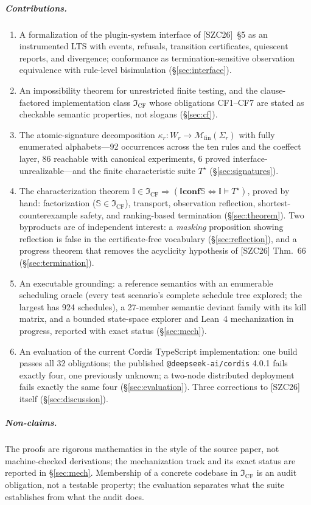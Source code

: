 \documentclass[sigplan,screen,review,nonacm]{acmart}
\newcommand{\Spec}{\ensuremath{\mathbb S}}
\newcommand{\Impl}{\ensuremath{\mathbb I}}
\newcommand{\conf}{\mathrel{\mathbf{conf}}}
\newcommand{\CF}{\ensuremath{\mathfrak I_{\mathrm{CF}}}}
\newcommand{\Tstar}{\ensuremath{T^{\star}}}
\newcommand{\occ}[1]{\ensuremath{\Sigma_{#1}}}
\newcommand{\kap}[1]{\ensuremath{\kappa_{#1}}}
\newcommand{\Mfin}{\ensuremath{\mathcal M_{\mathrm{fin}}}}
\newcommand{\SZC}{[SZC26]}
\begin{document}
\subparagraph{Contributions.}
\begin{enumerate}
\item A formalization of the plugin-system interface of \SZC{}~\S5 as an
  instrumented LTS with events, refusals, transition certificates, quiescent
  reports, and divergence; conformance as termination-sensitive observation
  equivalence with rule-level bisimulation (\S\ref{sec:interface}).
\item An impossibility theorem for unrestricted finite testing, and the
  clause-factored implementation class \CF{} whose obligations CF1--CF7 are
  stated as checkable semantic properties, not slogans
  (\S\ref{sec:cf}).
\item The atomic-signature decomposition $\kap r : W_r \to \Mfin(\occ r)$ with
  fully enumerated alphabets---92 occurrences across the ten rules and the
  coeffect layer, 86 reachable with canonical experiments, 6 proved
  interface-unrealizable---and the finite characteristic suite \Tstar{}
  (\S\ref{sec:signatures}).
\item The characterization theorem
  $\Impl \in \CF \Rightarrow (\Impl \conf \Spec \iff \Impl \models \Tstar)$,
  proved by hand: factorization ($\Spec \in \CF$), transport, observation
  reflection, shortest-counterexample safety, and ranking-based termination
  (\S\ref{sec:theorem}). Two byproducts are of independent interest: a
  \emph{masking} proposition showing reflection is false in the
  certificate-free vocabulary (\S\ref{sec:reflection}), and a progress theorem
  that removes the acyclicity hypothesis of \SZC{} Thm.~66
  (\S\ref{sec:termination}).
\item An executable grounding: a reference semantics with an enumerable
  scheduling oracle (every test scenario's complete schedule tree explored; the
  largest has 924 schedules), a 27-member semantic deviant family with its kill
  matrix, and a bounded state-space explorer and Lean~4 mechanization in
  progress, reported with exact status (\S\ref{sec:mech}).
\item An evaluation of the current Cordis TypeScript implementation: one build
  passes all 32 obligations; the published \texttt{@deepseek-ai/cordis} 4.0.1
  fails exactly four, one previously unknown; a two-node distributed deployment
  fails exactly the same four (\S\ref{sec:evaluation}). Three corrections to
  \SZC{} itself (\S\ref{sec:discussion}).
\end{enumerate}

\subparagraph{Non-claims.} The proofs are rigorous mathematics in the style of
the source paper, not machine-checked derivations; the mechanization track and
its exact status are reported in \S\ref{sec:mech}. Membership of a concrete
codebase in \CF{} is an audit obligation, not a testable property; the
evaluation separates what the suite establishes from what the audit does.
\end{document}
